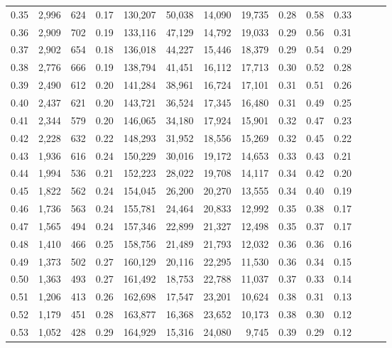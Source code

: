\begin{tabular}{rrrrrrrrrrrrrr}
0.35 &  2,996 &  624 &  0.17 &  130,207 &   50,038 &  14,090 &  19,735 &  0.28 &  0.58 &      0.33 \\
0.36 &  2,909 &  702 &  0.19 &  133,116 &   47,129 &  14,792 &  19,033 &  0.29 &  0.56 &      0.31 \\
0.37 &  2,902 &  654 &  0.18 &  136,018 &   44,227 &  15,446 &  18,379 &  0.29 &  0.54 &      0.29 \\
0.38 &  2,776 &  666 &  0.19 &  138,794 &   41,451 &  16,112 &  17,713 &  0.30 &  0.52 &      0.28 \\
0.39 &  2,490 &  612 &  0.20 &  141,284 &   38,961 &  16,724 &  17,101 &  0.31 &  0.51 &      0.26 \\
0.40 &  2,437 &  621 &  0.20 &  143,721 &   36,524 &  17,345 &  16,480 &  0.31 &  0.49 &      0.25 \\
0.41 &  2,344 &  579 &  0.20 &  146,065 &   34,180 &  17,924 &  15,901 &  0.32 &  0.47 &      0.23 \\
0.42 &  2,228 &  632 &  0.22 &  148,293 &   31,952 &  18,556 &  15,269 &  0.32 &  0.45 &      0.22 \\
0.43 &  1,936 &  616 &  0.24 &  150,229 &   30,016 &  19,172 &  14,653 &  0.33 &  0.43 &      0.21 \\
0.44 &  1,994 &  536 &  0.21 &  152,223 &   28,022 &  19,708 &  14,117 &  0.34 &  0.42 &      0.20 \\
0.45 &  1,822 &  562 &  0.24 &  154,045 &   26,200 &  20,270 &  13,555 &  0.34 &  0.40 &      0.19 \\
0.46 &  1,736 &  563 &  0.24 &  155,781 &   24,464 &  20,833 &  12,992 &  0.35 &  0.38 &      0.17 \\
0.47 &  1,565 &  494 &  0.24 &  157,346 &   22,899 &  21,327 &  12,498 &  0.35 &  0.37 &      0.17 \\
0.48 &  1,410 &  466 &  0.25 &  158,756 &   21,489 &  21,793 &  12,032 &  0.36 &  0.36 &      0.16 \\
0.49 &  1,373 &  502 &  0.27 &  160,129 &   20,116 &  22,295 &  11,530 &  0.36 &  0.34 &      0.15 \\
0.50 &  1,363 &  493 &  0.27 &  161,492 &   18,753 &  22,788 &  11,037 &  0.37 &  0.33 &      0.14 \\
0.51 &  1,206 &  413 &  0.26 &  162,698 &   17,547 &  23,201 &  10,624 &  0.38 &  0.31 &      0.13 \\
0.52 &  1,179 &  451 &  0.28 &  163,877 &   16,368 &  23,652 &  10,173 &  0.38 &  0.30 &      0.12 \\
0.53 &  1,052 &  428 &  0.29 &  164,929 &   15,316 &  24,080 &   9,745 &  0.39 &  0.29 &      0.12 \\

\end{tabular}
